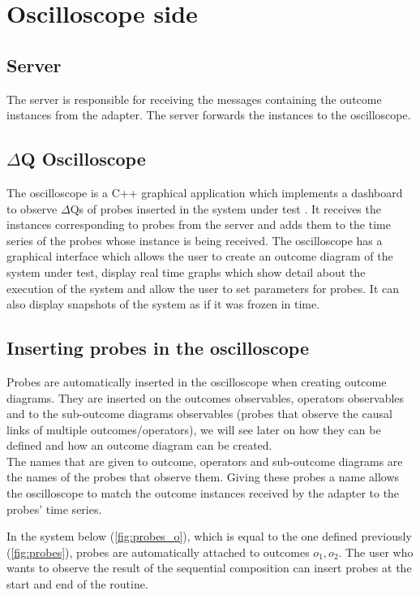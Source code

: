 \section{Oscilloscope side}
    \subsection{Server} The server is responsible for receiving the messages containing the outcome instances from the adapter. The server forwards the instances to the oscilloscope.
    
    \subsection{$\Delta$Q Oscilloscope} The oscilloscope is a C++ graphical application which implements a dashboard to observe $\Delta$Qs of probes inserted in the system under test \cite{osc-g}. It receives the instances corresponding to probes from the server and adds them to the time series of the probes whose instance is being received. 
    The oscilloscope has a graphical interface which allows the user to create an outcome diagram of the system under test, display real time graphs which show detail about the execution of the system and allow the user to set parameters for probes. It can also display snapshots of the system as if it was frozen in time.

    \subsection{Inserting probes in the oscilloscope}
        Probes are automatically inserted in the oscilloscope when creating outcome diagrams. They are inserted on the outcomes observables, operators observables and to the sub-outcome diagrams observables (probes that observe the causal links of multiple outcomes/operators), we will see later on how they can be defined and how an outcome diagram can be created. \\
    The names that are given to outcome, operators and sub-outcome diagrams are the names of the probes that observe them. Giving these probes a name allows the oscilloscope to match the outcome instances received by the adapter to the probes' time series.

        In the system below (\cref{fig:probes_o}), which is equal to the one defined previously (\cref{fig:probes}), probes are automatically attached to outcomes $o_1, o_2$. The user who wants to observe the result of the sequential composition can insert probes at the start and end of the routine. 
    
